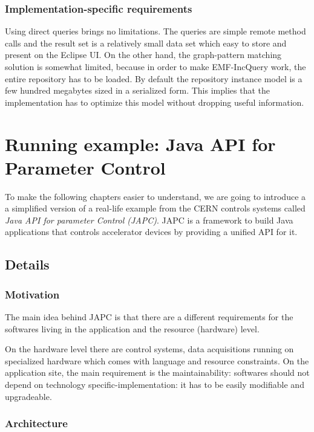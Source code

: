 \subsubsection{Implementation-specific requirements}
Using direct queries brings no limitations. The queries are simple remote method
calls and the result set is a relatively small data set which easy to store and
present on the Eclipse UI. On the other hand, the graph-pattern matching
solution is somewhat limited, because in order to make EMF-IncQuery work,
the entire repository has to be loaded. By default the repository instance model
is a few hundred megabytes sized in a serialized form. This implies that the
implementation has to optimize this model without dropping useful information.

\section{Running example: Java API for Parameter Control}\label{sect:spf}
To make the following chapters easier to understand, we are going to introduce a
a simplified version of a real-life example from the CERN controls systems called
\emph{Java API for parameter Control (JAPC)}\cite{Japc05}.  JAPC is a
framework to build Java applications that controls accelerator devices by
providing a unified API for it. 

\subsection{Details}\label{sect:spfdesc}

\subsubsection{Motivation}
The main idea behind JAPC is that there are a different requirements for the 
softwares living in the application and the resource (hardware) level. 

On the hardware level there are control systems, data acquisitions 
running on specialized hardware which comes with language and resource 
constraints. On the application site, the main requirement is the
maintainability: softwares should not depend on technology
specific-implementation: it has to be easily modifiable and upgradeable.

\subsubsection{Architecture}

